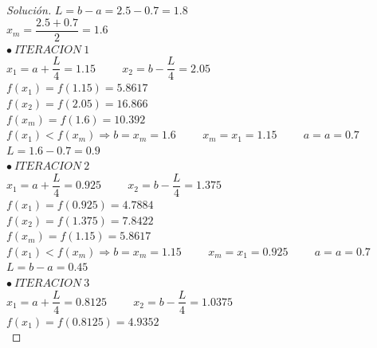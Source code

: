 \documentclass[12pt,oneside]{book}
\newenvironment{solution}{\begin{proof}[Solución]}{\end{proof}}
\begin{document}
\begin{solution}
    \hspace{0.5cm}$L=b-a=2.5-0.7=1.8$\\
	
	$x_m=\dfrac{2.5+0.7}{2}=1.6$\\
	
	$\bullet\ ITERACION\ 1$\\
	
	$x_1=a+\dfrac{L}{4}=1.15 \hspace{1cm} x_2=b-\dfrac{L}{4}=2.05$\\
	
	$f(x_1)=f(1.15)=5.8617$\\

	$f(x_2)=f(2.05)=16.866$\\

	$f(x_m)=f(1.6)=10.392$\\
	
	$f(x_1)<f(x_m) \Rightarrow b=x_m=1.6 \hspace{1cm} x_m=x_1=1.15 \hspace{1cm} a=a=0.7$\\
	
	$L=1.6-0.7=0.9$\\
	
	$\bullet\ ITERACION\ 2$\\

	$x_1=a+\dfrac{L}{4}=0.925 \hspace{1cm} x_2=b-\dfrac{L}{4}=1.375$\\
	
	$f(x_1)=f(0.925)=4.7884$\\
	
	$f(x_2)=f(1.375)=7.8422$\\
	
	$f(x_m)=f(1.15)=5.8617$\\
	
	$f(x_1)<f(x_m) \Rightarrow b=x_m=1.15 \hspace{1cm} x_m=x_1=0.925 \hspace{1cm} a=a=0.7$\\
	
	$L=b-a=0.45$\\
	
	$\bullet\ ITERACION\ 3$\\
	
	$x_1=a+\dfrac{L}{4}=0.8125 \hspace{1cm} x_2=b-\dfrac{L}{4}=1.0375$\\
	
	$f(x_1)=f(0.8125)=4.9352$\\
	

\end{solution}
\end{document}
